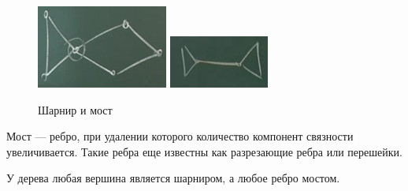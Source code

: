 \documentclass[a4paper,12pt]{article}
\theoremstyle{plain} %
\theoremstyle{definition} %
\theoremstyle{remark} %
\begin{document}
\begin{figure}
	\begin{center}
		\includegraphics[width=\linewidth]{sharnir}
		\includegraphics[width=\linewidth]{most}
		\caption{Шарнир и мост}
		\label{Fig:sharnir}
		\vspace{-4cm}
	\end{center}
\end{figure}

Мост --- ребро, при удалении которого количество компонент связности увеличивается. Такие ребра еще известны как разрезающие ребра или перешейки.

У дерева любая вершина является шарниром, а любое ребро мостом.
\end{document}
